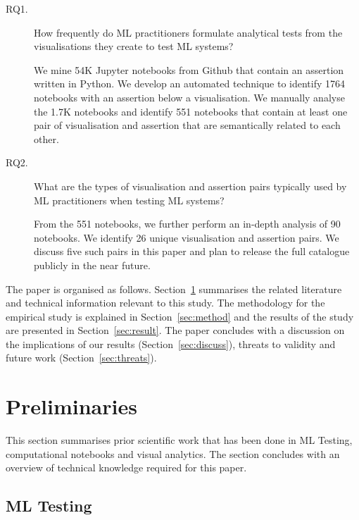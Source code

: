 \documentclass[conference]{IEEEtran}
\begin{document}
\begin{description}
\item[RQ1.] How frequently do ML practitioners formulate analytical tests from the visualisations they create to test ML systems?

We mine 54K Jupyter notebooks from Github that contain an assertion written in Python. We develop an automated technique to identify 1764 notebooks with an assertion below a visualisation. We manually analyse the 1.7K notebooks and identify 551 notebooks that contain at least one pair of visualisation and assertion that are semantically related to each other.

\item[RQ2.] What are the types of visualisation and assertion pairs typically used by ML practitioners when testing ML systems?

From the 551 notebooks, we further perform an in-depth analysis of 90 notebooks. We identify 26 unique visualisation and assertion pairs. We discuss five such pairs in this paper and plan to release the full catalogue publicly in the near future.

\end{description}


The paper is organised as follows. Section~\ref{sec:prelim} summarises the related literature and technical information relevant to this study. The methodology for the empirical study is explained in Section~\ref{sec:method} and the results of the study are presented in Section~\ref{sec:result}. The paper concludes with a discussion on the implications of our results (Section~\ref{sec:discuss}), threats to validity and future work (Section~\ref{sec:threats}).

\section{Preliminaries}\label{sec:prelim}


This section summarises prior scientific work that has been done in ML Testing, computational notebooks and visual analytics. The section concludes with an overview of technical knowledge required for this paper.

\subsection{ML Testing}\label{sec:ml-testing}
\end{document}
